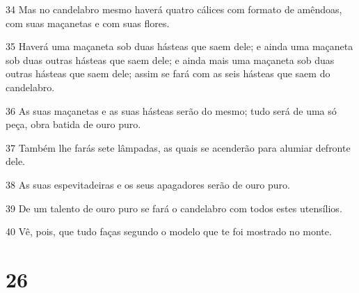 \par 34 Mas no candelabro mesmo haverá quatro cálices com formato de amêndoas, com suas maçanetas e com suas flores.
\par 35 Haverá uma maçaneta sob duas hásteas que saem dele; e ainda uma maçaneta sob duas outras hásteas que saem dele; e ainda mais uma maçaneta sob duas outras hásteas que saem dele; assim se fará com as seis hásteas que saem do candelabro.
\par 36 As suas maçanetas e as suas hásteas serão do mesmo; tudo será de uma só peça, obra batida de ouro puro.
\par 37 Também lhe farás sete lâmpadas, as quais se acenderão para alumiar defronte dele.
\par 38 As suas espevitadeiras e os seus apagadores serão de ouro puro.
\par 39 De um talento de ouro puro se fará o candelabro com todos estes utensílios.
\par 40 Vê, pois, que tudo faças segundo o modelo que te foi mostrado no monte.

\chapter{26}

